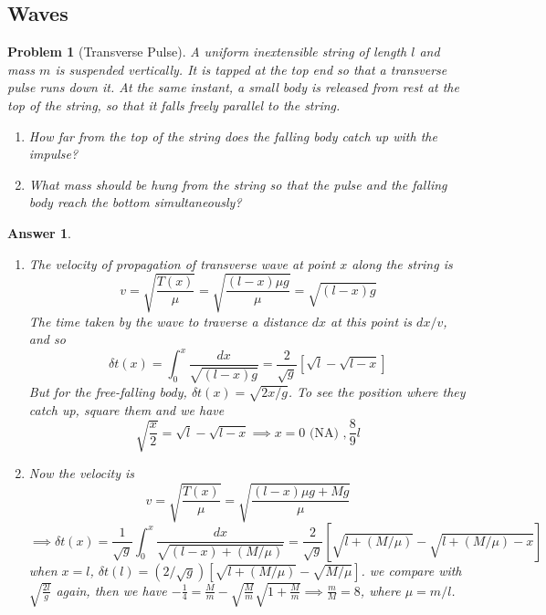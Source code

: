 \documentclass[a4paper]{article}
\newtheorem{ans}{Answer}[section]
\theoremstyle{new}
\newtheorem{qns}{Problem}[section]
\begin{document}
\subsection{Waves}
\begin{qns}[Transverse Pulse]
A uniform inextensible string of length $l$ and mass $m$ is suspended vertically. It is tapped at the top end so that a transverse pulse runs down it. At the same instant, a small body is released from rest at the top of the string, so that it falls freely parallel to the string.
\begin{enumerate}[label=(\alph*)]
    \item How far from the top of the string does the falling body catch up with the impulse?
    \item What mass should be hung from the string so that the pulse and the falling body reach the bottom simultaneously?
\end{enumerate}
\end{qns}
\begin{ans}\leavevmode
\begin{enumerate}[label=(\alph*)]
\item The velocity of propagation of transverse wave at point $x$ along the string is
$$v=\sqrt{\frac{T(x)}{\mu}}=\sqrt{\frac{(l-x)\mu g}{\mu}}=\sqrt{(l-x)g}$$
The time taken by the wave to traverse a distance $dx$ at this point is $dx/v$, and so
$$\delta t(x)=\int_0^x\frac{dx}{\sqrt{(l-x)g}}=\frac{2}{\sqrt{g}}[\sqrt{l}-\sqrt{l-x}]$$
But for the free-falling body, $\delta t(x)=\sqrt{2x/g}$. To see the position where they catch up, square them and we have
$$\sqrt{\frac{x}{2}}=\sqrt{l}-\sqrt{l-x}\implies x=0\text{ (NA)   },\frac{8}{9}l$$
\item Now the velocity is
$$v=\sqrt{\frac{T(x)}{\mu}}=\sqrt{\frac{(l-x)\mu g+Mg}{\mu}}$$
$$\implies\delta t(x)=\frac{1}{\sqrt{g}}\int_0^x\frac{dx}{\sqrt{(l-x)+(M/\mu)}}=\frac{2}{\sqrt{g}}[\sqrt{l+(M/\mu)}-\sqrt{l+(M/\mu)-x}]$$
when $x=l$, $\delta t(l)=(2/\sqrt{g})[\sqrt{l+(M/\mu)}-\sqrt{M/\mu}]$. we compare with $\sqrt{\frac{2l}{g}}$ again, then we have $-\frac{1}{4}=\frac{M}{m}-\sqrt{\frac{M}{m}}\sqrt{1+\frac{M}{m}}\implies\frac{m}{M}=8$, where $\mu=m/l$.
\end{enumerate}
\end{ans}
\newpage
\end{document}
